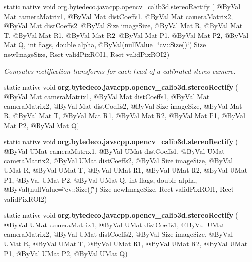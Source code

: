 \begin{DoxyCompactItemize}
\item 
static native void \hyperlink{group__calib3d_ga10101a04b035018f2589ecc315d38ce5}{org.\+bytedeco.\+javacpp.\+opencv\+\_\+calib3d.\+stereo\+Rectify} ( @By\+Val Mat camera\+Matrix1, @By\+Val Mat dist\+Coeffs1, @By\+Val Mat camera\+Matrix2, @By\+Val Mat dist\+Coeffs2, @By\+Val Size image\+Size, @By\+Val Mat R, @By\+Val Mat T, @By\+Val Mat R1, @By\+Val Mat R2, @By\+Val Mat P1, @By\+Val Mat P2, @By\+Val Mat Q, int flags, double alpha, @By\+Val(null\+Value=\char`\"{}cv\+::\+Size()\char`\"{}) Size new\+Image\+Size, Rect valid\+Pix\+R\+O\+I1, Rect valid\+Pix\+R\+O\+I2)
\begin{DoxyCompactList}\small\item\em Computes rectification transforms for each head of a calibrated stereo camera. \end{DoxyCompactList}\item 
\mbox{\label{group__calib3d_gaf3bbb2d6e1a9cc31cc823907bfa508fa}} 
static native void {\bfseries org.\+bytedeco.\+javacpp.\+opencv\+\_\+calib3d.\+stereo\+Rectify} ( @By\+Val Mat camera\+Matrix1, @By\+Val Mat dist\+Coeffs1, @By\+Val Mat camera\+Matrix2, @By\+Val Mat dist\+Coeffs2, @By\+Val Size image\+Size, @By\+Val Mat R, @By\+Val Mat T, @By\+Val Mat R1, @By\+Val Mat R2, @By\+Val Mat P1, @By\+Val Mat P2, @By\+Val Mat Q)
\item 
\mbox{\label{group__calib3d_ga4193ad0f9efe3fde4a91c918f9977dc4}} 
static native void {\bfseries org.\+bytedeco.\+javacpp.\+opencv\+\_\+calib3d.\+stereo\+Rectify} ( @By\+Val U\+Mat camera\+Matrix1, @By\+Val U\+Mat dist\+Coeffs1, @By\+Val U\+Mat camera\+Matrix2, @By\+Val U\+Mat dist\+Coeffs2, @By\+Val Size image\+Size, @By\+Val U\+Mat R, @By\+Val U\+Mat T, @By\+Val U\+Mat R1, @By\+Val U\+Mat R2, @By\+Val U\+Mat P1, @By\+Val U\+Mat P2, @By\+Val U\+Mat Q, int flags, double alpha, @By\+Val(null\+Value=\char`\"{}cv\+::\+Size()\char`\"{}) Size new\+Image\+Size, Rect valid\+Pix\+R\+O\+I1, Rect valid\+Pix\+R\+O\+I2)
\item 
\mbox{\label{group__calib3d_ga44c05e142bc5b25ecbe763d0e596d74e}} 
static native void {\bfseries org.\+bytedeco.\+javacpp.\+opencv\+\_\+calib3d.\+stereo\+Rectify} ( @By\+Val U\+Mat camera\+Matrix1, @By\+Val U\+Mat dist\+Coeffs1, @By\+Val U\+Mat camera\+Matrix2, @By\+Val U\+Mat dist\+Coeffs2, @By\+Val Size image\+Size, @By\+Val U\+Mat R, @By\+Val U\+Mat T, @By\+Val U\+Mat R1, @By\+Val U\+Mat R2, @By\+Val U\+Mat P1, @By\+Val U\+Mat P2, @By\+Val U\+Mat Q)

\end{DoxyCompactItemize}
